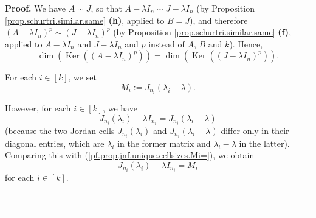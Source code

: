 \documentclass[numbers=enddot,12pt,final,onecolumn,notitlepage]{scrartcl}%
\numberwithin{exer}{subsection}
\theoremstyle{definition}
\newenvironment{proof}[1][Proof]{\noindent\textbf{#1.} }{\ \rule{0.5em}{0.5em}}
\begin{document}
\begin{proof}
We have $A\sim J$, so that $A-\lambda I_{n}\sim J-\lambda I_{n}$ (by
Proposition \ref{prop.schurtri.similar.same} \textbf{(h)}, applied to $B=J$),
and therefore $\left(  A-\lambda I_{n}\right)  ^{p}\sim\left(  J-\lambda
I_{n}\right)  ^{p}$ (by Proposition \ref{prop.schurtri.similar.same}
\textbf{(f)}, applied to $A-\lambda I_{n}$ and $J-\lambda I_{n}$ and $p$
instead of $A$, $B$ and $k$). Hence,%
\begin{equation}
\dim\left(  \operatorname*{Ker}\left(  \left(  A-\lambda I_{n}\right)
^{p}\right)  \right)  =\dim\left(  \operatorname*{Ker}\left(  \left(
J-\lambda I_{n}\right)  ^{p}\right)  \right)  .
\label{pf.prop.jnf.unique.cellsizes.dimKer1}%
\end{equation}


For each $i\in\left[  k\right]  $, we set
\begin{equation}
M_{i}:=J_{n_{i}}\left(  \lambda_{i}-\lambda\right)  .
\label{pf.prop.jnf.unique.cellsizes.Mi=}%
\end{equation}


However, for each $i\in\left[  k\right]  $, we have%
\begin{equation}
J_{n_{i}}\left(  \lambda_{i}\right)  -\lambda I_{n_{i}}=J_{n_{i}}\left(
\lambda_{i}-\lambda\right)  \label{pf.prop.jnf.unique.cellsizes.J-lam}%
\end{equation}
(because the two Jordan cells $J_{n_{i}}\left(  \lambda_{i}\right)  $ and
$J_{n_{i}}\left(  \lambda_{i}-\lambda\right)  $ differ only in their diagonal
entries, which are $\lambda_{i}$ in the former matrix and $\lambda_{i}%
-\lambda$ in the latter). Comparing this with
(\ref{pf.prop.jnf.unique.cellsizes.Mi=}), we obtain%
\begin{equation}
J_{n_{i}}\left(  \lambda_{i}\right)  -\lambda I_{n_{i}}=M_{i}
\label{pf.prop.jnf.unique.cellsizes.J-lam2}%
\end{equation}
for each $i\in\left[  k\right]  $.


\end{proof}
\end{document}
